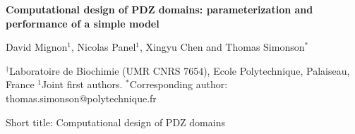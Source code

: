 \documentclass[12pt]{article}
\begin{document}
 

\parindent 0mm


\vspace{5cm}

\begin{center}

\Large 
 
{\bf Computational design of PDZ domains: parameterization and performance of a simple model}
 
\vspace{1cm}

\normalsize

David Mignon$^1$, Nicolas Panel$^1$, Xingyu Chen and Thomas Simonson$^{\ast}$
 
\vspace{1cm}

$^{\dag}$Laboratoire de Biochimie (UMR CNRS 7654), Ecole Polytechnique, Palaiseau, France 
$^1$Joint first authors. $^{\ast}$Corresponding author: thomas.simonson@polytechnique.fr 

\end{center} 

\vfill

Short title: Computational design of PDZ domains 

\pagebreak
\end{document}
